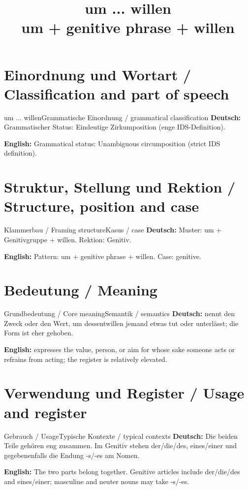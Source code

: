 \documentclass[a4paper,11pt]{article}
\title{um ... willen\\ \large um + genitive phrase + willen}
\date{}
\newcommand{\GermanText}[1]{\textbf{Deutsch: }#1\par}
\newcommand{\EnglishText}[1]{{\small\color{SoftGray}\textbf{English: }#1\par}}
\begin{document}
\maketitle
\tableofcontents
\newpage
\section{Einordnung und Wortart / Classification and part of speech}
\begin{grammarentry}{um ... willen}{Grammatische Einordnung / grammatical classification}
\GermanText{Grammatischer Status: Eindeutige Zirkumposition (enge IDS-Definition).}
\EnglishText{Grammatical status: Unambiguous circumposition (strict IDS definition).}
\end{grammarentry}
\section{Struktur, Stellung und Rektion / Structure, position and case}
\begin{grammarentry}{Klammerbau / Framing structure}{Kasus / case}
\GermanText{Muster: um + Genitivgruppe + willen. Rektion: Genitiv.}
\EnglishText{Pattern: um + genitive phrase + willen. Case: genitive.}
\end{grammarentry}
\section{Bedeutung / Meaning}
\begin{grammarentry}{Grundbedeutung / Core meaning}{Semantik / semantics}
\GermanText{nennt den Zweck oder den Wert, um dessentwillen jemand etwas tut oder unterlässt; die Form ist eher gehoben.}
\EnglishText{expresses the value, person, or aim for whose sake someone acts or refrains from acting; the register is relatively elevated.}
\end{grammarentry}
\section{Verwendung und Register / Usage and register}
\begin{grammarentry}{Gebrauch / Usage}{Typische Kontexte / typical contexts}
\GermanText{Die beiden Teile gehören eng zusammen. Im Genitiv stehen der/die/des, eines/einer und gegebenenfalls die Endung -s/-es am Nomen.}
\EnglishText{The two parts belong together. Genitive articles include der/die/des and eines/einer; masculine and neuter nouns may take -s/-es.}
\end{grammarentry}
\end{document}
